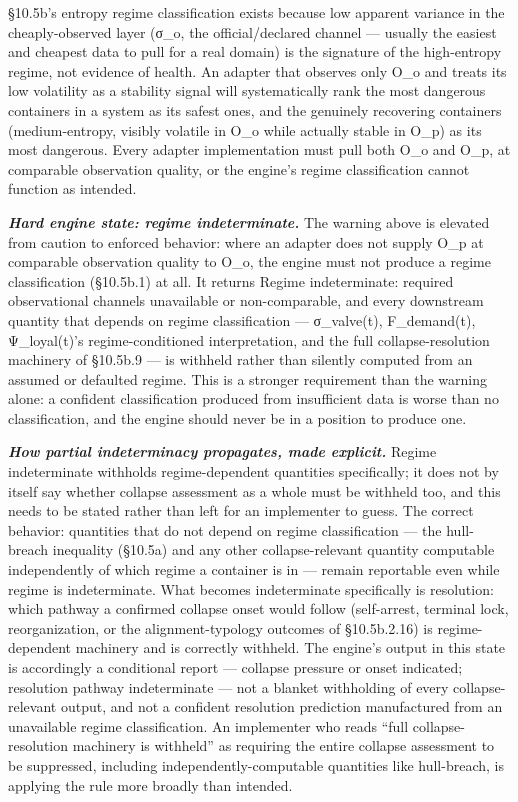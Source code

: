 \documentclass[
]{article}
\begin{document}
§10.5b's entropy regime classification exists because low apparent
variance in the cheaply-observed layer (σ\_o, the official/declared
channel --- usually the easiest and cheapest data to pull for a real
domain) is the signature of the high-entropy regime, not evidence of
health. An adapter that observes only O\_o and treats its low volatility
as a stability signal will systematically rank the most dangerous
containers in a system as its safest ones, and the genuinely recovering
containers (medium-entropy, visibly volatile in O\_o while actually
stable in O\_p) as its most dangerous. Every adapter implementation must
pull both O\_o and O\_p, at comparable observation quality, or the
engine's regime classification cannot function as intended.

\emph{\textbf{Hard engine state: regime indeterminate.}} The warning
above is elevated from caution to enforced behavior: where an adapter
does not supply O\_p at comparable observation quality to O\_o, the
engine must not produce a regime classification (§10.5b.1) at all. It
returns Regime indeterminate: required observational channels
unavailable or non-comparable, and every downstream quantity that
depends on regime classification --- σ\_valve(t), F\_demand(t),
Ψ\_loyal(t)'s regime-conditioned interpretation, and the full
collapse-resolution machinery of §10.5b.9 --- is withheld rather than
silently computed from an assumed or defaulted regime. This is a
stronger requirement than the warning alone: a confident classification
produced from insufficient data is worse than no classification, and the
engine should never be in a position to produce one.

\emph{\textbf{How partial indeterminacy propagates, made explicit.}}
Regime indeterminate withholds regime-dependent quantities specifically;
it does not by itself say whether collapse assessment as a whole must be
withheld too, and this needs to be stated rather than left for an
implementer to guess. The correct behavior: quantities that do not
depend on regime classification --- the hull-breach inequality (§10.5a)
and any other collapse-relevant quantity computable independently of
which regime a container is in --- remain reportable even while regime
is indeterminate. What becomes indeterminate specifically is resolution:
which pathway a confirmed collapse onset would follow (self-arrest,
terminal lock, reorganization, or the alignment-typology outcomes of
§10.5b.2.16) is regime-dependent machinery and is correctly withheld.
The engine's output in this state is accordingly a conditional report
--- collapse pressure or onset indicated; resolution pathway
indeterminate --- not a blanket withholding of every collapse-relevant
output, and not a confident resolution prediction manufactured from an
unavailable regime classification. An implementer who reads ``full
collapse-resolution machinery is withheld'' as requiring the entire
collapse assessment to be suppressed, including independently-computable
quantities like hull-breach, is applying the rule more broadly than
intended.
\end{document}

